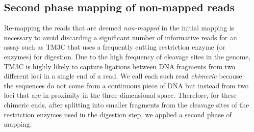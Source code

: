 \subsection{Second phase mapping of non-mapped reads}
Re-mapping the reads that are deemed \emph{non-mapped} in the initial mapping
is necessary to avoid discarding a significant number of informative reads for
an assay such as TM3C that uses a frequently cutting restriction enzyme (or
enzymes) for digestion. Due to the high frequency of cleavage sites in the
genome, TM3C is highly likely to capture ligations between DNA fragments from two
different loci in a single end of a read. We call each such read
\emph{chimeric} because the sequences do not come from a continuous piece of
DNA but instead from two loci that are in proximity in the three-dimensional
space. Therefore, for these chimeric ends, after splitting into smaller
fragments from the cleavage sites of the restriction enzymes used in the digestion
step, we applied a second phase of mapping.

